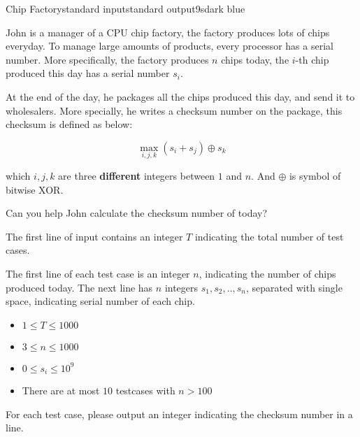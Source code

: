 \begin{problem}{Chip Factory}{standard input}{standard output}{9s}{dark blue}

John is a manager of a CPU chip factory, the factory produces lots of chips everyday. To manage large amounts of products, every processor has a serial number. More specifically, the factory produces $n$ chips today, the $i$-th chip produced this day has a serial number $s_i$.

At the end of the day, he packages all the chips produced this day, and send it to wholesalers. More specially, he writes a checksum number on the package, this checksum is defined as below:

$$\max_{i,j,k} (s_i+s_j) \oplus s_k$$

which $i,j,k$ are three {\bf different} integers between $1$ and $n$. And $\oplus$ is symbol of bitwise XOR.

Can you help John calculate the checksum number of today?

\InputFile
The first line of input contains an integer $T$ indicating the total number of test cases.

The first line of each test case is an integer $n$, indicating the number of chips produced today. The next line has $n$ integers $s_1, s_2, .., s_n$, separated with single space, indicating serial number of each chip.
\begin{itemize}
\item $1 \le T \le 1000$
\item $3 \le n \le 1000$
\item $0 \le s_i \le 10^9$
\item There are at most $10$ testcases with $n > 100$ 
\end{itemize}

\OutputFile
For each test case, please output an integer indicating the checksum number in a line.

\Example

\begin{example}
%
\end{example}
\end{problem}